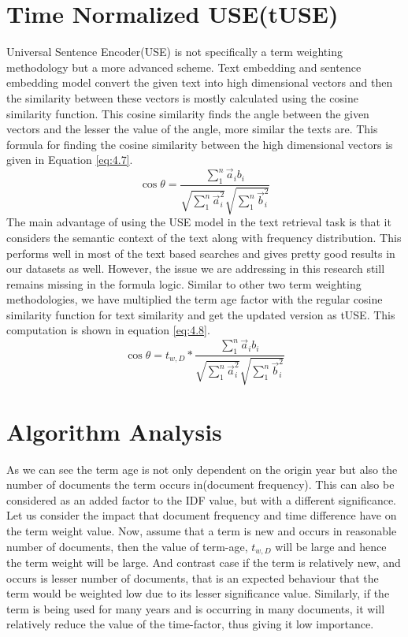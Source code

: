 \section{Time Normalized USE(tUSE)}
Universal Sentence Encoder(USE) is not specifically a term weighting methodology but a more advanced scheme. Text embedding and sentence embedding model convert the given text into high dimensional vectors and then the similarity between these vectors is mostly calculated using the cosine similarity function. This cosine similarity finds the angle between the given vectors and the lesser the value of the angle, more similar the texts are. This formula for finding the cosine similarity between the high dimensional vectors is given in Equation \ref{eq:4.7}.
\begin{equation} \label{eq:4.7}
    \cos \theta = \frac{\sum_{1}^{n} \vec a_{i}b_{i}}{\sqrt{\sum_{1}^{n} \vec a_{i}^2}\sqrt{\sum_{1}^{n} \vec b_{i}^2}}
\end{equation}
The main advantage of using the USE model in the text retrieval task is that it considers the semantic context of the text along with frequency distribution. This performs well in most of the text based searches and gives pretty good results in our datasets as well. However, the issue we are addressing in this research still remains missing in the formula logic. Similar to other two term weighting methodologies, we have multiplied the term age factor with the regular cosine similarity function for text similarity and get the updated version as tUSE. This computation is shown in equation \ref{eq:4.8}.
\begin{equation} \label{eq:4.8}
    \cos \theta = t_{w,D}*\frac{\sum_{1}^{n} \vec a_{i}b_{i}}{\sqrt{\sum_{1}^{n} \vec a_{i}^2}\sqrt{\sum_{1}^{n} \vec b_{i}^2}}
\end{equation}
\section{Algorithm Analysis}
As we can see the term age is not only dependent on the origin year but also the number of documents the term occurs in(document frequency). This can also be considered as an added factor to the IDF value, but with a different significance. Let us consider the impact that document frequency and time difference have on the term weight value. Now, assume that a term is new and occurs in reasonable number of documents, then the value of term-age, $t_{w,D}$ will be large and hence the term weight will be large.
And contrast case if the term is relatively new, and occurs is lesser number of documents, that is an expected behaviour that the term would be weighted low due to its lesser significance value.
Similarly, if the term is being used for many years and is occurring in many documents, it will relatively reduce the value of the time-factor, thus giving it low importance. 

